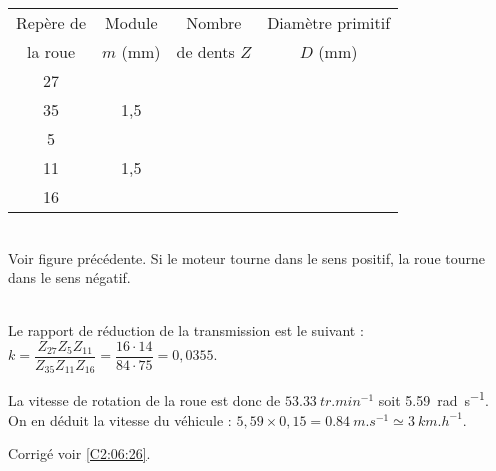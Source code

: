 \normalsize

\else
\footnotesize
\begin{center}
\begin{tabular}{|c|c|c|c|}
\hline
Repère de  & Module  & Nombre & Diamètre primitif  \\
la roue & $m$ (mm) & de dents $Z$ & $D$ (mm) \\
\hline
\hline
27 & & & \\ \hline
35 & 1,5& & \\ \hline
5& & & \\ \hline
11& 1,5 & & \\ \hline
16& & & \\ \hline

\end{tabular}
\end{center}

\normalsize
\fi


\ifprof ~\\
Voir figure précédente. Si le moteur tourne dans le sens positif, la roue tourne dans le sens négatif. 
\else
\fi

\ifprof ~\\
Le rapport de réduction de la transmission est le suivant : 
$k=\dfrac{Z_{27} Z_{5} Z_{11} }{Z_{35} Z_{11} Z_{16}} = \dfrac{16\cdot 14}{84\cdot 75} =0,0355 $.

La vitesse de rotation de la roue est donc de $\SI{53,33}{tr.min^{-1}}$ soit \SI{5,59}{rad.s^{-1}}. 
On en déduit la vitesse du véhicule : $5,59 \times 0,15 = \SI{0,84}{m.s^{-1}}\simeq \SI{3}{km.h^{-1}}$.

\else
\fi

\ifprof
\else
\begin{flushright}
\footnotesize{Corrigé  voir \ref{C2:06:26}.}
\end{flushright}%
\fi